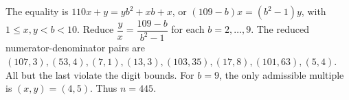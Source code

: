 The equality is $110x+y=yb^2+xb+x$, or $(109-b)x=(b^2-1)y$, with $1\le x,y<b<10$. Reduce $\dfrac{y}{x}=\dfrac{109-b}{b^2-1}$ for each $b=2,\ldots,9$. The reduced numerator-denominator pairs are $(107,3),(53,4),(7,1),(13,3),(103,35),(17,8),(101,63),(5,4)$. All but the last violate the digit bounds. For $b=9$, the only admissible multiple is $(x,y)=(4,5)$. Thus $\boxed{n=445}$.
